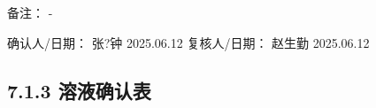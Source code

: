 \documentclass[UTF8,10pt,a4paper,fontset=fandol]{ctexart}
\newcommand{\fieldvalue}[1]{#1}
\newcommand{\handwritten}[1]{#1}
\begin{document}
备注：%
\fieldvalue{\handwritten{-}}

\vspace{0.3em}

确认人/日期：%
\fieldvalue{\handwritten{张?钟}}\quad
\fieldvalue{\handwritten{2025.06.12}}
\qquad
复核人/日期：%
\fieldvalue{\handwritten{赵生勤}}\quad
\fieldvalue{\handwritten{2025.06.12}}

\subsection*{7.1.3 溶液确认表}
\end{document}
